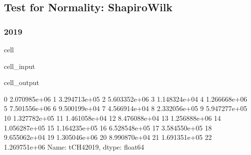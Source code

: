 \documentclass[letterpaper,10pt,english]{jupyterBook}
\begin{document}
\subsection{Test for Normality: Shapiro\sphinxhyphen{}Wilk}
\label{\detokenize{notebooks/testing_malaysian_paper:test-for-normality-shapiro-wilk}}

\subsubsection{2019}
\label{\detokenize{notebooks/testing_malaysian_paper:id1}}
\begin{sphinxuseclass}{cell}\begin{sphinxVerbatimInput}

\begin{sphinxuseclass}{cell_input}
\begin{sphinxVerbatim}[commandchars=\\\{\}]
  \PYG{p}{[}\PYG{p}{]}
\end{sphinxVerbatim}

\end{sphinxuseclass}\end{sphinxVerbatimInput}
\begin{sphinxVerbatimOutput}

\begin{sphinxuseclass}{cell_output}
\begin{sphinxVerbatim}[commandchars=\\\{\}]
0     2.070985e+06
1     3.294713e+05
2     5.603352e+06
3     1.148324e+04
4     1.266668e+06
5     7.501556e+06
6     9.500199e+04
7     4.566914e+04
8     2.332056e+05
9     5.947277e+05
10    1.327782e+05
11    1.461058e+04
12    8.476088e+04
13    1.256888e+06
14    1.056287e+05
15    1.164235e+05
16    6.528548e+05
17    3.584550e+05
18    9.655062e+04
19    1.305046e+06
20    8.990870e+04
21    1.691351e+05
22    1.269751e+06
Name: tCH4\PYGZus{}2019, dtype: float64
\end{sphinxVerbatim}

\end{sphinxuseclass}\end{sphinxVerbatimOutput}

\end{sphinxuseclass}
\end{document}

